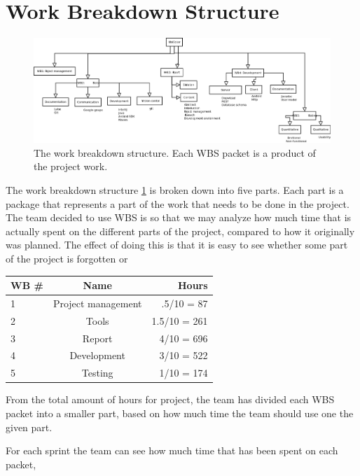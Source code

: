 \section{Work Breakdown Structure}

\begin{figure}[H]
\includegraphics[width=\textwidth]{ch/planning/fig/WBS.png}
\caption{The work breakdown structure. Each WBS packet is a product of the project work.}
\label{fig:wbs}
\end{figure}


The work breakdown structure \ref{fig:wbs} is broken down into five parts. Each part is a package that represents a part of the work that needs to be done in the project.
The team decided to use WBS is so that we may analyze how much time that is actually spent on the different parts of the project, compared to how it originally was planned.
The effect of doing this is that it is easy to see whether some part of the project is forgotten or 

\begin{table}[H]
\centering
{}
\begin{tabular}{l c r}
    \textbf{WB \#} & \textbf{Name} & \textbf{Hours} \\\hline
    1 & Project management & .5/10 = 87\\\hline
    2 & Tools 			   & 1.5/10 = 261\\\hline
    3 & Report 			   & 4/10 = 696\\\hline
    4 & Development 	   & 3/10 = 522\\\hline
    5 & Testing  		   & 1/10 = 174\\\hline
\end{tabular}
\end{table}

From the total amount of hours for project, the team has divided each WBS packet into a smaller part, based on how much time the team should use one the given part.

For each sprint the team can see how much time that has been spent on each packet, 